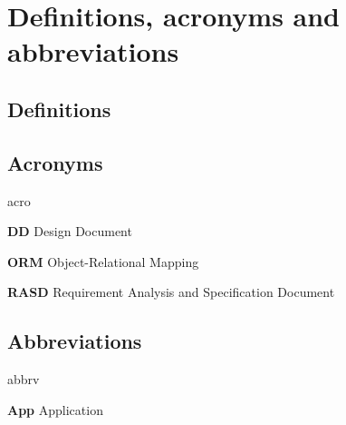 
\section{Definitions, acronyms and abbreviations}

\subsection{Definitions}

\subsection{Acronyms}
	\begin{labeling}{acro}
		\item[\textbf{DD}] Design Document
		\item[\textbf{ORM}] Object-Relational Mapping
		\item[\textbf{RASD}] Requirement Analysis and Specification Document
	\end{labeling}

\subsection{Abbreviations}
	\begin{labeling}{abbrv}
		\item[\textbf{App}] Application
	\end{labeling}